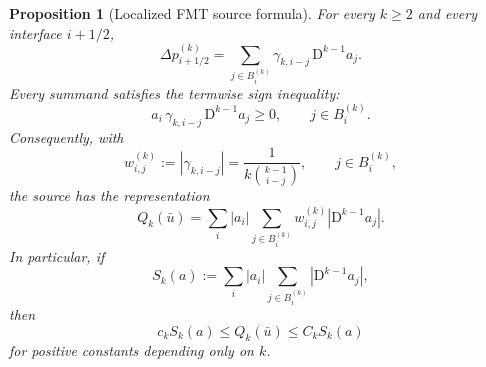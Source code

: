\documentclass[11pt]{amsart}
\theoremstyle{plain}
\newtheorem{proposition}[theorem]{Proposition}
\theoremstyle{definition}
\theoremstyle{remark}
\numberwithin{equation}{section}
\theoremstyle{plain}
\begin{document}
\begin{proposition}[Localized FMT source formula]
	\label{prop:localized-fmt-source}
	For every $k\ge2$ and every interface $i+1/2$,
	\begin{equation}\label{eq:fmt-localized-expansion}
		\Delta p_{i+1/2}^{(k)}
		=\sum_{j\in B_i^{(k)}}
		\gamma_{k,i-j}\,\mathrm D^{k-1}a_j.
	\end{equation}
	Every summand satisfies the termwise sign inequality:
	\begin{equation}\label{eq:fmt-termwise-sign}
		a_i\,\gamma_{k,i-j}\,\mathrm D^{k-1}a_j\ge0,
		\qquad j\in B_i^{(k)}.
	\end{equation}
	Consequently, with
	\begin{equation}\label{eq:fmt-positive-weight}
		w_{i,j}^{(k)}
		:=|\gamma_{k,i-j}|
		=\frac{1}{k\binom{k-1}{i-j}},
		\qquad j\in B_i^{(k)},
	\end{equation}
	the source has the representation
	\begin{equation}\label{eq:fmt-interval-source}
		Q_k(\bar u)
		=\sum_i|a_i|\sum_{j\in B_i^{(k)}}
		w_{i,j}^{(k)}|\mathrm D^{k-1}a_j|.
	\end{equation}
	In particular, if
	\begin{equation}\label{eq:interval-functional}
		S_k(a)
		:=\sum_i|a_i|\sum_{j\in B_i^{(k)}}
		|\mathrm D^{k-1}a_j|,
	\end{equation}
	then
	\begin{equation}\label{eq:interval-source-comparison}
		c_kS_k(a)\le Q_k(\bar u)\le C_kS_k(a)
	\end{equation}
	for positive constants depending only on $k$.
\end{proposition}
\end{document}
